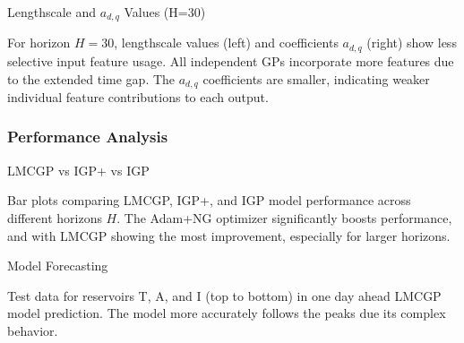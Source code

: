 \begin{frame}{Lengthscale and $a_{d,q}$ Values (H=30)}
	\begin{figure}[htbp]
		\setlength{} 
		\setlength{}
		\subfloat[]{}\hspace{-0.8em}
		\subfloat[]{}
	\end{figure}
	\vspace{-2.0em}
	\begin{block}{}
		For horizon $H=30$, lengthscale values (left) and coefficients $a_{d,q}$ (right) show less selective input feature usage. All independent GPs incorporate more features due to the extended time gap. The $a_{d,q}$ coefficients are smaller, indicating weaker individual feature contributions to each output.
	\end{block}
	

\end{frame}

\subsubsection{Performance Analysis}

\begin{frame}{LMCGP vs IGP+ vs IGP}
	\begin{figure}[htbp]
		\centering
		\setlength{}
		\setlength{}
		
		\subfloat[NLPD]{}
		\hfill
		\subfloat[MSLL]{}
		
	\end{figure}
	\vspace{-2.0em}
	\begin{block}{}
		Bar plots comparing LMCGP, IGP+, and IGP model performance across different horizons \(H\). The Adam+NG optimizer significantly boosts performance, and with LMCGP showing the most improvement, especially for larger horizons.
	\end{block}
	
	
\end{frame}

\begin{frame}{Model Forecasting}
	\begin{figure}[htbp]
		\centering
		\setlength\figurewidth{\columnwidth} 
		\setlength{}
		
		\hfill
		\hfill
		
	\end{figure}
	\vspace{-1.3em}
	\begin{block}{}
		Test data for reservoirs T, A, and I (top to bottom) in one day ahead LMCGP model prediction. The model more accurately follows the peaks due its complex behavior.
	\end{block}
\end{frame}



